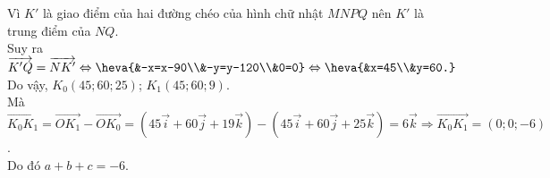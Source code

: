 \begin{bt}
{		Vì $K'$ là giao điểm của hai đường chéo của hình chữ nhật $MNPQ$ nên $K'$ là trung  điểm của $NQ$.\\
		Suy ra $\overrightarrow{K'Q} = \overrightarrow{NK'} \Leftrightarrow \heva{&-x=x-90\\&-y=y-120\\&0=0} \Leftrightarrow \heva{&x=45\\&y=60.}$\\ 
		Do vậy, $K_0\left(45; 60; 25  \right)$; $K_1\left(45; 60; 9\right)$.\\
		Mà $\overrightarrow{K_0K_1}  = \overrightarrow{OK_1} - \overrightarrow{OK_0} = \left(45\overrightarrow{i} + 60\overrightarrow{j} + 19\overrightarrow{k} \right) - \left(45\overrightarrow{i} + 60\overrightarrow{j} + 25\overrightarrow{k} \right)= 6\overrightarrow{k} \Rightarrow \overrightarrow{K_0K_1} = \left(0;0; -6\right)$.\\
		 Do đó $a + b + c = -6$.
	} 
\end{bt}

